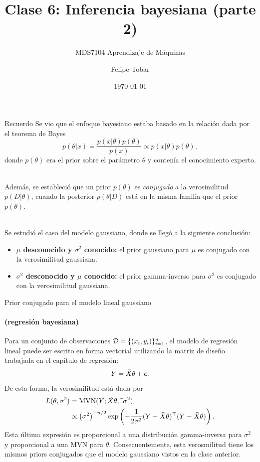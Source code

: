 \documentclass[9pt, handout]{beamer}
\title{Clase 6: Inferencia bayesiana (parte 2)}
\subtitle{MDS7104 Aprendizaje de Máquinas}
\date{\today}
\author{Felipe Tobar}
\institute{Iniciativa de Datos e Inteligencia Artificial\\Universidad de Chile}
\begin{document}
\begin{frame}
  \titlepage
\end{frame}

\begin{frame}{Recuerdo}
Se vio que el enfoque bayesiano estaba basado en la relación dada por el teorema de Bayes
	\begin{equation*}
	p(\theta|x) = \frac{p(x|\theta)p(\theta)}{p(x)} \propto p(x|\theta)p(\theta),\label{eq:Bayes}
\end{equation*}
donde $p(\theta)$ era el prior sobre el parámetro $\theta$ y contenía el conocimiento experto.\\~\ \pause

Además, se estableció que un prior $p(\theta)$ es \emph{conjugado} a la verosimilitud $p(D|\theta)$, cuando la posterior $p(\theta|D)$ está en la misma familia que el prior $p(\theta)$.\\~\ \pause

Se estudió el caso del modelo gaussiano, donde se llegó a la siguiente conclusión:

\begin{itemize}
	\item \textbf{$\mu$ desconocido y $\sigma^2$ conocido:} el prior gaussiano para $\mu$ es conjugado con la verosimilitud gaussiana.
	\item \textbf{$\sigma^2$ desconocido y $\mu$ conocido:} el prior gamma-inverso para $\sigma^2$ es conjugado con la verosimilitud gaussiana. 
\end{itemize}

\end{frame}

\begin{frame}{Prior conjugado para el modelo lineal gaussiano}
\framesubtitle{(regresión bayesiana)}

Para un conjunto de observaciones ${\mathcal D}=\{(x_i,y_i)\}_{i=1}^n$, el modelo de regresión lineal puede ser escrito en forma vectorial utilizando la matriz de diseño trabajada en el capítulo de regresión:
\begin{equation*}
 	Y = \tilde{X}\theta + {\bm \epsilon}.
 \end{equation*} \pause
De esta forma, la verosimilitud está dada por 
\begin{align*}
	L(\theta,\sigma^2) &= \operatorname{\text{MVN}}(Y; \tilde{X}\theta, {\mathbb I}\sigma^2)\\
					&\propto \left(\sigma^2\right)^{-n/2}   \exp\left(-\frac{1}{2\sigma^2} (Y - \tilde{X}\theta)^\top(Y - \tilde{X}\theta)\right).\nonumber
\end{align*} \pause
Esta última  expresión es proporcional a una distribución gamma-inversa para $\sigma^2$ y proporcional a una MVN para $\theta$. Consecuentemente, esta verosmilitud tiene los mismos priors conjugados que el modelo gaussiano vistos en la clase anterior. 
	
\end{frame}
\end{document}
